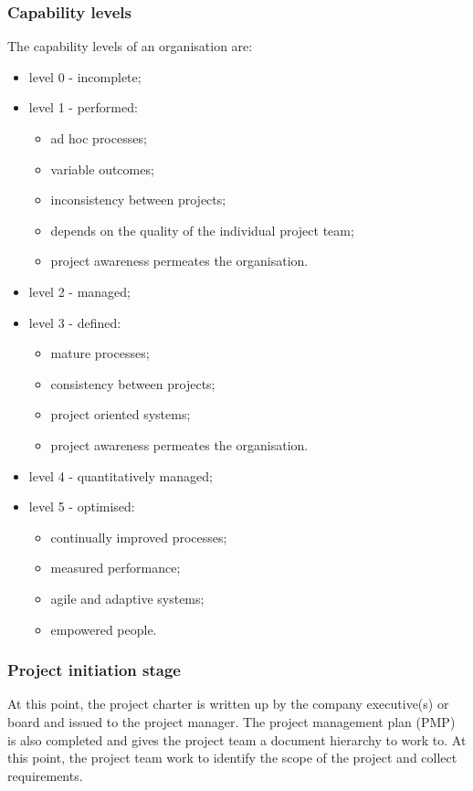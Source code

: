 \documentclass[journal]{IEEEtran}
\begin{document}
\subsubsection{Capability levels}
The capability levels of an organisation are:
\begin{itemize}
	\item level 0 - incomplete;
	\item level 1 - performed:
	\begin{itemize}
		\item ad hoc processes;
		\item variable outcomes;
		\item inconsistency between projects;
		\item depends on the quality of the individual project team;
		\item project awareness permeates the organisation.
	\end{itemize}
	\item level 2 - managed;
	\item level 3 - defined:
	\begin{itemize}
		\item mature processes;
		\item consistency between projects;
		\item project oriented systems;
		\item project awareness permeates the organisation.
	\end{itemize}
	\item level 4 - quantitatively managed;
	\item level 5 - optimised:
	\begin{itemize}
		\item continually improved processes;
		\item measured performance;
		\item agile and adaptive systems;
		\item empowered people.
	\end{itemize}
\end{itemize}
\subsubsection{Project initiation stage}
At this point, the project charter is written up by the company executive(s) or board and issued to the project manager. The project management plan (PMP) is also completed and gives the project team a document hierarchy to work to. At this point, the project team work to identify the scope of the project and collect requirements.
\end{document}
